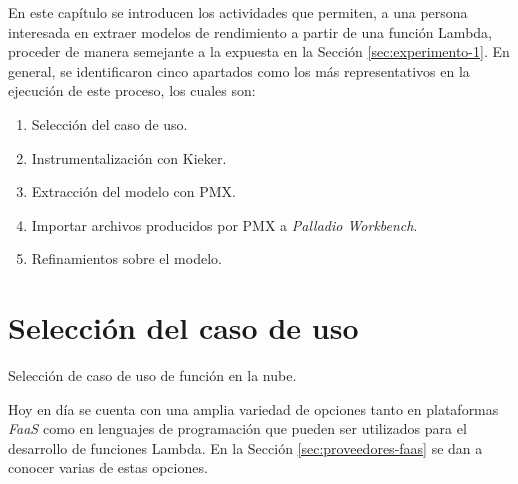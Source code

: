En este capítulo se introducen los actividades que permiten, a una persona interesada en extraer modelos de rendimiento a partir de una función Lambda, proceder de manera semejante a la expuesta en la Sección \ref{sec:experimento-1}. En general, se identificaron cinco apartados como los más representativos en la ejecución de este proceso, los cuales son:
\begin{enumerate}
    \item Selección del caso de uso.
    \item Instrumentalización con Kieker.
    \item Extracción del modelo con PMX.
    \item Importar archivos producidos por PMX a \emph{Palladio Workbench}.
    \item Refinamientos sobre el modelo.
\end{enumerate}

\section{Selección del caso de uso}

\begin{singlespace}
\begin{algorithm}[H]
\SetAlgoLined

\caption{Selección de caso de uso de función en la nube.}
\end{algorithm}
\end{singlespace}

Hoy en día se cuenta con una amplia variedad de opciones tanto en plataformas \emph{FaaS} como en lenguajes de programación que pueden ser utilizados para el desarrollo de funciones Lambda. En la Sección \ref{sec:proveedores-faas} se dan a conocer varias de estas opciones.

